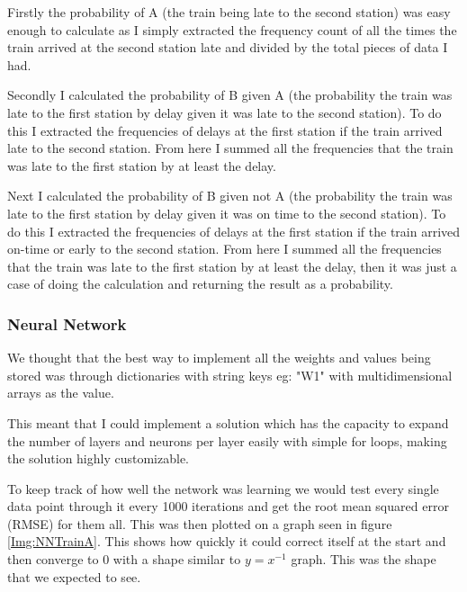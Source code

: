 \documentclass[11pt]{article}
\begin{document}
	Firstly the probability of A (the train being late to the second station)  was easy enough to calculate as I simply extracted the frequency count of all the times the train arrived at the second station late and divided by the total pieces of data I had.

	Secondly I calculated the probability of B given A (the probability the train was late to the first station by delay given it was late to the second station). To do this I extracted the frequencies of delays at the first station if the train arrived late to the second station. From here I summed all the frequencies that the train was late to the first station by at least the delay.

	Next I calculated the probability of B given not A (the probability the train was late to the first station by delay given it was on time to the second station). To do this I extracted the frequencies of delays at the first station if the train arrived on-time or early to the second station. From here I summed all the frequencies that the train was late to the first station by at least the delay, then it was just a case of doing the calculation and returning the result as a probability.

	\subsubsection{Neural Network}

	 We thought that the best way to implement all the weights and values being stored was through dictionaries with string keys eg: "W1" with multidimensional arrays as the value.

	 This meant that I could implement a solution which has the capacity to expand the number of layers and neurons per layer easily with simple for loops, making the solution highly customizable.

	 To keep track of how well the network was learning we would test every single data point through it every 1000 iterations and get the root mean squared error (RMSE) for them all. This was then plotted on a graph seen in figure \ref{Img:NNTrainA}. This shows how quickly it could correct itself at the start and then converge to 0 with a shape similar to $y=x^{-1}$ graph. This was the shape that we expected to see.
\end{document}
